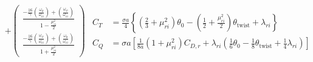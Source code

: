 \begin{subequations}
\begin{equation}
\begin{array}{rr}
                & +
                \left(
                    \begin{array}{c}
                        \frac{-\frac{16}{\gamma}\left(\frac{\omega_{\theta}}{\omega_{ri}}\right) + \left(\frac{\omega_{\psi}}{\omega_{ri}}\right)}{1 - \frac{\mu_{ri}^{2}}{2}} \\
                        \frac{-\frac{16}{\gamma}\left(\frac{\omega_{\psi}}{\omega_{ri}}\right) + \left(\frac{\omega_{\theta}}{\omega_{ri}}\right)}{1 + \frac{\mu_{ri}^{2}}{2}}
                    \end{array}
                \right)
            \end{array}
        \end{equation}


        \begin{align}
            C_{T} &= \frac{\sigma a}{4}\left\lbrace
                  \left( \frac{2}{3} + \mu_{ri}^{2} \right) \theta_{0}
                - \left( \frac{1}{2} + \frac{\mu_{ri}^{2}}{2} \right) \theta_{\text{twist}}
                + \lambda_{ri}
            \right\rbrace \label{eq:observer:ct}\\
%
%
%
            C_{Q} &= \sigma a \left[
                \frac{1}{8a}\left( 1 + \mu_{ri}^{2} \right) C_{D,r}
                + \lambda_{ri}\left(
                    \frac{1}{6}\theta_{0}
                    - \frac{1}{8}\theta_{\text{twist}}
                    + \frac{1}{4}\lambda_{ri}
                    \right)
                \right] \label{eq:observer:cq}
        \end{align}
    \end{subequations}

